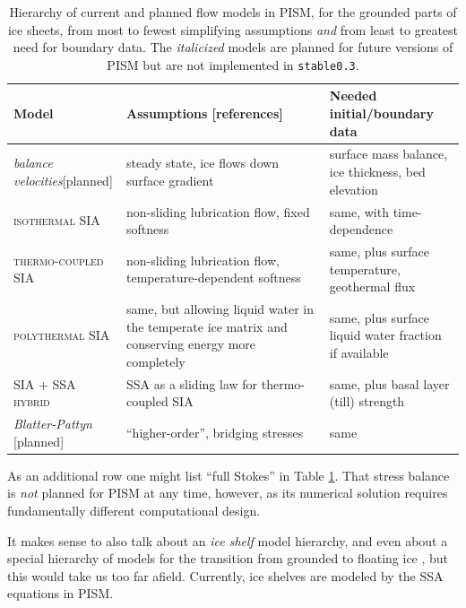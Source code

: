 \documentclass[11pt,final]{amsart}
\begin{document}
\begin{table}[ht]
\caption{Hierarchy of current and planned flow models in PISM, for the grounded parts of ice sheets, from most to fewest simplifying assumptions \emph{and} from least to greatest need for boundary data.  The \emph{italicized} models are planned for future versions of PISM but are not implemented in \texttt{stable0.3}.}\label{tab:modelhierarchy} 
\small
\begin{tabular}{p{0.25\linewidth}p{0.45\linewidth}p{0.35\linewidth}}\hline
\textbf{Model} & \textbf{Assumptions [references]} & \textbf{Needed initial/boundary data} \\ \hline
\emph{balance velocities}\tiny[planned]\small & steady state, ice flows down surface gradient \cite{JoughinetalGrBal97} & surface mass balance, ice  thickness, bed elevation \\
\textsc{isothermal SIA} & non-sliding lubrication flow, fixed softness \cite{BLKCB,EISMINT96} & same, with time-dependence \\
\textsc{thermo-coupled SIA} & non-sliding lubrication flow, temperature-dependent softness \cite{BBL,EISMINT00} & same, plus surface temperature,  geothermal flux \\
\textsc{polythermal SIA} & same, but allowing liquid water in the temperate ice matrix and conserving energy more completely \cite{AschwandenBlatter,Greve} & same, plus surface liquid water fraction if available \\
\textsc{SIA + SSA hybrid} & SSA as a sliding law for thermo-coupled SIA \cite{BBssasliding} & same, plus basal layer (till) strength \\
\emph{Blatter-Pattyn} \tiny[planned]\small & ``higher-order'', bridging stresses \cite{Blatter,Pattyn03,SchoofCoulombBlatter} & same \\ \hline
\end{tabular}
\normalsize
\end{table}

As an additional row one might list ``full Stokes'' in Table \ref{tab:modelhierarchy}.  That stress balance is \emph{not} planned for PISM at any time, however, as its numerical solution requires fundamentally different computational design.

It makes sense to also talk about an \emph{ice shelf} model hierarchy, and even about a special hierarchy of models for the transition from grounded to floating ice \cite{SchoofMarine1}, but this would take us too far afield.  Currently, ice shelves are modeled by the SSA equations in PISM.
\end{document}
